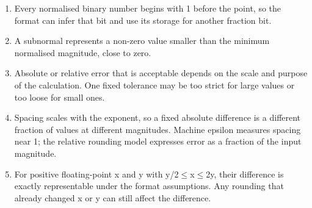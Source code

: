 \documentclass[11pt]{article}
\begin{document}
\begin{keepsection}
\begin{enumerate}
\item Every normalised binary number begins with 1 before the point, so the format can infer that bit and use its storage for another fraction bit.
\item A subnormal represents a non-zero value smaller than the minimum normalised magnitude, close to zero.
\item Absolute or relative error that is acceptable depends on the scale and purpose of the calculation. One fixed tolerance may be too strict for large values or too loose for small ones.
\item Spacing scales with the exponent, so a fixed absolute difference is a different fraction of values at different magnitudes. Machine epsilon measures spacing near 1; the relative rounding model expresses error as a fraction of the input magnitude.
\item For positive floating-point x and y with y/2\ensuremath{\leq}x\ensuremath{\leq}2y, their difference is exactly representable under the format assumptions. Any rounding that already changed x or y can still affect the difference.
\end{enumerate}

\end{keepsection}
\end{document}
